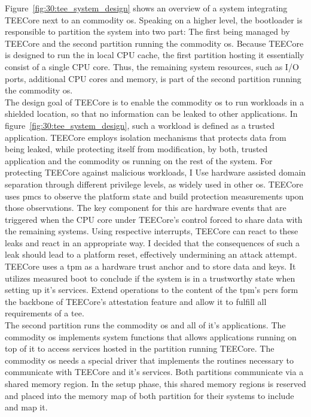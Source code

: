 Figure~\ref{fig:30:tee_system_design} shows an overview of a system integrating
TEECore next to an commodity \gls{os}. Speaking on a higher level, the
bootloader is responsible to partition the system into two part: The first being
managed by TEECore and the second partition running the commodity \gls{os}.
Because TEECore is designed to run the in local CPU cache, the first partition
hosting it essentially consist of a single CPU core. Thus, the remaining system
resources, such as I/O ports, additional CPU cores and memory, is part of the
second partition running the commodity \gls{os}.\\

The design goal of TEECore is to enable the commodity \gls{os} to run workloads
in a shielded location, so that no information can be leaked to other
applications. In figure~\ref{fig:30:tee_system_design}, such a workload is
defined as a trusted application. TEECore employs isolation mechanisms that
protects data from being leaked, while protecting itself from modification, by
both, trusted application and the commodity \gls{os} running on the rest of the
system. For protecting TEECore against malicious workloads, I Use hardware
assisted domain separation through different privilege levels, as widely used in
other \gls{os}. TEECore uses \glspl{pmc} to observe the platform state and build
protection measurements upon those observations. The key component for this are
hardware events that are triggered when the CPU core under TEECore's control
forced to share data with the remaining systems. Using respective interrupts,
TEECore can react to these leaks and react in an appropriate way. I decided that
the consequences of such a leak should lead to a platform reset, effectively
undermining an attack attempt.\\

TEECore uses a \gls{tpm} as a hardware trust anchor and to store data and keys.
It utilizes measured boot to conclude if the system is in a trustworthy state
when setting up it's services. Extend operations to the content of the
\gls{tpm}'s \glspl{pcr} form the backbone of TEECore's attestation feature and
allow it to fulfill all requirements of a \gls{tee}.\\

The second partition runs the commodity \gls{os} and all of it's applications.
The commodity \gls{os} implements system functions that allows applications
running on top of it to access services hosted in the partition running TEECore.
The commodity \gls{os} needs a special driver that implements the routines
necessary to communicate with TEECore and it's services. Both partitions
communicate via a shared memory region. In the setup phase, this shared memory
regions is reserved and placed into the memory map of both partition for their
systems to include and map it.

